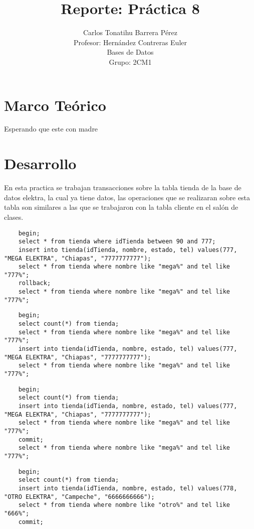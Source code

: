 \documentclass[12pt, titlepage]{article}
\title{Reporte: Práctica 8}
\author{Carlos Tonatihu Barrera Pérez \\ Profesor: Hernández Contreras Euler \\ Bases de Datos \\ Grupo: 2CM1 }
\begin{document}
	\maketitle
	\tableofcontents
	\section{Marco Teórico}
	Esperando que este con madre
	\section{Desarrollo}
	En esta practica se trabajan transacciones sobre la tabla tienda de la base de datos elektra, la cual ya tiene datos, las operaciones que se realizaran sobre esta tabla son similares a las que se trabajaron con la tabla cliente en el salón de clases.

	\begin{lstlisting}
	begin;
	select * from tienda where idTienda between 90 and 777;
	insert into tienda(idTienda, nombre, estado, tel) values(777, "MEGA ELEKTRA", "Chiapas", "7777777777");
	select * from tienda where nombre like "mega%" and tel like "777%";
	rollback;
	select * from tienda where nombre like "mega%" and tel like "777%";
	\end{lstlisting}
	
	\begin{lstlisting}
	begin;
	select count(*) from tienda;
	select * from tienda where nombre like "mega%" and tel like "777%";
	insert into tienda(idTienda, nombre, estado, tel) values(777, "MEGA ELEKTRA", "Chiapas", "7777777777");
	select * from tienda where nombre like "mega%" and tel like "777%";
	\end{lstlisting}
	
	\begin{lstlisting}
	begin;
	select count(*) from tienda;
	insert into tienda(idTienda, nombre, estado, tel) values(777, "MEGA ELEKTRA", "Chiapas", "7777777777");
	select * from tienda where nombre like "mega%" and tel like "777%";
	commit;
	select * from tienda where nombre like "mega%" and tel like "777%";
	\end{lstlisting}
	
	\begin{lstlisting}
	begin;
	select count(*) from tienda;
	insert into tienda(idTienda, nombre, estado, tel) values(778, "OTRO ELEKTRA", "Campeche", "6666666666");
	select * from tienda where nombre like "otro%" and tel like "666%";
	commit;
	\end{lstlisting}
	
\end{document}
